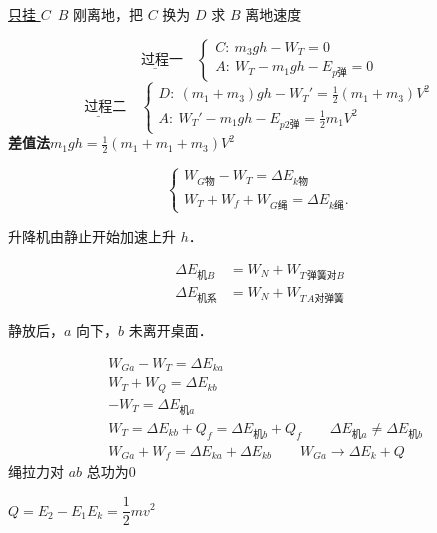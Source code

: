 \begin{problem}
\underline{只挂 $C$}\ $B$ 刚离地，把 $C$ 换为 $D$ 求 $B$ 离地速度
\begin{solution}
\[
\underline{\text{过程}}\text{一}\quad
\begin{cases}
C:\ m_3gh-W_T=0\\
A:\ W_T-m_1gh-E_{p\text{弹}}=0
\end{cases}
\]
\[
\underline{\text{过程}}\text{二}\quad
\begin{cases}
D:\ (m_1+m_3)gh-W_T'=\tfrac12(m_1+m_3)V^2\\
A:\ W_T'-m_1gh-E_{p2\text{弹}}=\tfrac12 m_1V^2
\end{cases}
\]
\textbf{差值法}\quad $m_1gh=\tfrac12(m_1+m_1+m_3)V^2$
\end{solution}
\end{problem}
\[
\begin{cases}
W_{G\text{物}}-W_T=\Delta E_{k\text{物}}\\
W_T+W_f+W_{G\text{绳}}=\Delta E_{k\text{绳}}.
\end{cases}
\]
\begin{problem}
升降机由静止开始加速上升 $h$．
\begin{solution}
\begin{align*}
\Delta E_{\text{机}B} &= W_N+W_{T\,\text{弹簧对}B}\\
\Delta E_{\text{机系}} &= W_N+W_{T\,A\text{对弹簧}}
\end{align*}
\end{solution}
\end{problem}
\begin{problem}
静放后，$a$ 向下，$b$ 未离开桌面．
\begin{solution}
\begin{align*}
&W_{Ga}-W_T=\Delta E_{ka}\\
&W_T+W_Q=\Delta E_{kb}\\
&-W_T=\Delta E_{\text{机}a}\\
&W_T=\Delta E_{kb}+Q_f=\Delta E_{\text{机}b}+Q_f\qquad \Delta E_{\text{机}a}\ne\Delta E_{\text{机}b}\\
&W_{Ga}+W_f=\Delta E_{ka}+\Delta E_{kb}\qquad W_{Ga}\to\Delta E_k+Q
\end{align*}
绳拉力对 $ab$ 总功为0
\end{solution}
\end{problem}
$Q=E_2-E_1$\qquad $E_k=\dfrac12mv^2$

